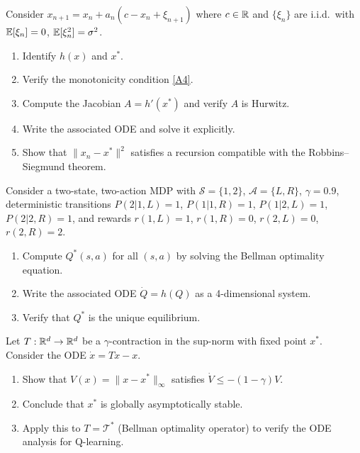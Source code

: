 \documentclass[11pt,a4paper]{article}
\begin{document}
\begin{exercise}
\label{ex:scalar-rm}
Consider $x_{n+1} = x_n + a_n(c - x_n + \xi_{n+1})$ where
$c \in \mathbb{R}$ and $\{\xi_n\}$ are i.i.d.\ with $\mathbb{E}[\xi_n] = 0$,
$\mathbb{E}[\xi_n^2] = \sigma^2$.
\begin{enumerate}[label=(\alph*)]
  \item Identify $h(x)$ and $x^*$.
  \item Verify the monotonicity condition \ref{A4}.
  \item Compute the Jacobian $A = h'(x^*)$ and verify $A$ is
    Hurwitz.
  \item Write the associated ODE and solve it explicitly.
  \item Show that $\|x_n - x^*\|^2$ satisfies a recursion compatible
    with the Robbins--Siegmund theorem.
\end{enumerate}
\end{exercise}

\begin{exercise}
\label{ex:ode-qlearning}
Consider a two-state, two-action MDP with
$\mathcal{S} = \{1,2\}$, $\mathcal{A} = \{L,R\}$, $\gamma = 0.9$,
deterministic transitions $P(2|1,L) = 1$, $P(1|1,R) = 1$,
$P(1|2,L) = 1$, $P(2|2,R) = 1$, and rewards $r(1,L) = 1$,
$r(1,R) = 0$, $r(2,L) = 0$, $r(2,R) = 2$.
\begin{enumerate}[label=(\alph*)]
  \item Compute $Q^*(s,a)$ for all $(s,a)$ by solving the Bellman
    optimality equation.
  \item Write the associated ODE $\dot{Q} = h(Q)$ as a
    4-dimensional system.
  \item Verify that $Q^*$ is the unique equilibrium.
\end{enumerate}
\end{exercise}

\begin{exercise}
\label{ex:lyapunov-contraction}
Let $T : \mathbb{R}^d \to \mathbb{R}^d$ be a $\gamma$-contraction in the sup-norm
with fixed point $x^*$. Consider the ODE $\dot{x} = Tx - x$.
\begin{enumerate}[label=(\alph*)]
  \item Show that $V(x) = \|x - x^*\|_\infty$ satisfies
    $\dot{V} \leq -(1-\gamma)V$.
  \item Conclude that $x^*$ is globally asymptotically stable.
  \item Apply this to $T = \mathcal{T}^*$ (Bellman optimality
    operator) to verify the ODE analysis for Q-learning.
\end{enumerate}
\end{exercise}
\end{document}
